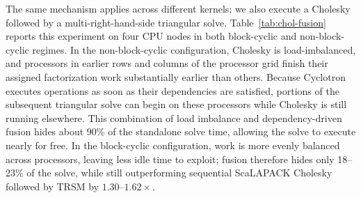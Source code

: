 \documentclass[sigplan, nonacm]{acmart}
\begin{document}
The same mechanism applies across different kernels; we also execute a Cholesky followed by a multi-right-hand-side triangular solve. Table~\ref{tab:chol-fusion} reports this experiment on four CPU nodes in both block-cyclic and non-block-cyclic regimes. In the non-block-cyclic configuration, Cholesky is load-imbalanced, and processors in earlier rows and columns of the processor grid finish their assigned factorization work substantially earlier than others. Because Cyclotron executes operations as soon as their dependencies are satisfied, portions of the subsequent triangular solve can begin on these processors while Cholesky is still running elsewhere. This combination of load imbalance and dependency-driven fusion hides about 90\% of the standalone solve time, allowing the solve to execute nearly for free. In the block-cyclic configuration, work is more evenly balanced across processors, leaving less idle time to exploit; fusion therefore hides only 18--23\% of the solve, while still outperforming sequential ScaLAPACK Cholesky followed by TRSM by \(1.30\)--\(1.62\times\).


\end{document}
